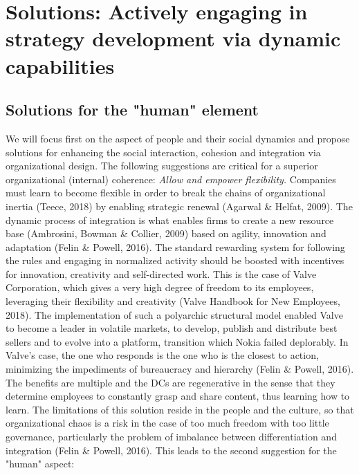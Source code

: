 \documentclass[11pt]{article}
\begin{document}
\newline \newline

\section{Solutions: Actively engaging in strategy development via dynamic capabilities}
\subsection{Solutions for the "human" element}
We will focus first on the aspect of people and their social dynamics and propose solutions for enhancing the social interaction, cohesion and integration via organizational design. The following suggestions are critical for a superior organizational (internal) coherence:
\newline \newline
\emph{Allow and empower flexibility.} Companies must learn to become flexible in order to break the chains of organizational inertia (Teece, 2018) by enabling strategic renewal (Agarwal \& Helfat, 2009). The dynamic process of integration is what enables firms to create a new resource base (Ambrosini, Bowman \& Collier, 2009) based on agility, innovation and adaptation (Felin \& Powell, 2016). The standard rewarding system for following the rules and engaging in normalized activity should be boosted with incentives for innovation, creativity and self-directed work. This is the case of Valve Corporation, which gives a very high degree of freedom to its employees, leveraging their flexibility and creativity (Valve Handbook for New Employees, 2018). The implementation of such a polyarchic structural model enabled Valve to become a leader in volatile markets, to develop, publish and distribute best sellers and to evolve into a platform, transition which Nokia failed deplorably. In Valve's case, the one who responds is the one who is the closest to action, minimizing the impediments of bureaucracy and hierarchy (Felin \& Powell, 2016). The benefits are multiple and the DCs are regenerative in the sense that they determine employees to constantly grasp and share content, thus learning how to learn. The limitations of this solution reside in the people and the culture, so that organizational chaos is a risk in the case of too much freedom with too little governance, particularly the problem of imbalance between differentiation and integration (Felin \& Powell, 2016). This leads to the second suggestion for the "human" aspect: \newline \newline
\end{document}

